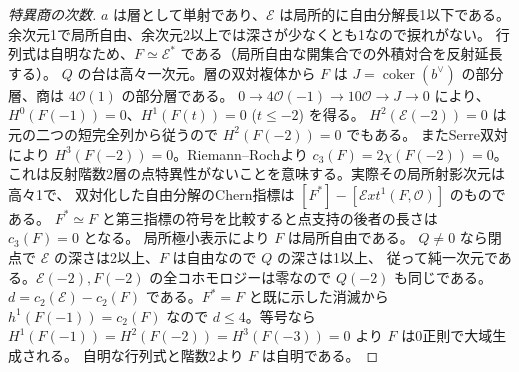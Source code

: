 \begin{proof}[特異商の次数]
$a$ は層として単射であり、$\mathcal E$ は局所的に自由分解長1以下である。
余次元1で局所自由、余次元2以上では深さが少なくとも1なので捩れがない。
行列式は自明なため、$F\simeq\mathcal E^*$ である（局所自由な開集合での外積対合を反射延長する）。
$Q$ の台は高々一次元。層の双対複体から $F$ は
$J=\operatorname{coker}(b^\vee)$ の部分層、商は $4\mathcal O(1)$ の部分層である。
$0\to4\mathcal O(-1)\to10\mathcal O\to J\to0$ により、
$H^0(F(-1))=0$、$H^1(F(t))=0$ ($t\le-2$) を得る。
$H^2(\mathcal E(-2))=0$ は元の二つの短完全列から従うので $H^2(F(-2))=0$ でもある。
またSerre双対により $H^3(F(-2))=0$。Riemann--Rochより $c_3(F)=2\chi(F(-2))=0$。
これは反射階数2層の点特異性がないことを意味する。実際その局所射影次元は高々1で、
双対化した自由分解のChern指標は $[F^*]-[\mathcal Ext^1(F,\mathcal O)]$ のものである。
$F^*\simeq F$ と第三指標の符号を比較すると点支持の後者の長さは $c_3(F)=0$ となる。
局所極小表示により $F$ は局所自由である。
$Q\ne0$ なら閉点で $\mathcal E$ の深さは2以上、$F$ は自由なので $Q$ の深さは1以上、
従って純一次元である。$\mathcal E(-2),F(-2)$ の全コホモロジーは零なので $Q(-2)$ も同じである。
$d=c_2(\mathcal E)-c_2(F)$ である。$F^*=F$ と既に示した消滅から
$h^1(F(-1))=c_2(F)$ なので $d\le4$。等号なら
$H^1(F(-1))=H^2(F(-2))=H^3(F(-3))=0$ より $F$ は0正則で大域生成される。
自明な行列式と階数2より $F$ は自明である。
\end{proof}
